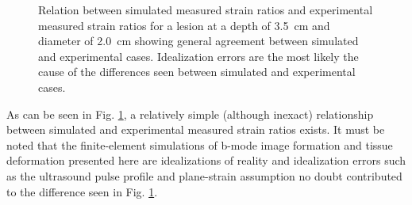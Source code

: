 			\begin{figure}[!htb]
				\centering
				\caption[Experimental validation of quasi-static model results]{Relation between simulated measured strain ratios and experimental measured strain ratios for a lesion at a depth of \SI{3.5}{\cm} and diameter of \SI{2.0}{\cm} showing general agreement between simulated and experimental cases. Idealization errors are the most likely the cause of the differences seen between simulated and experimental cases.}
				\label{fig:phantom_validation}
			\end{figure}

			As can be seen in Fig. \ref{fig:phantom_validation}, a relatively simple (although inexact) relationship between simulated and experimental measured strain ratios exists. It must be noted that the finite-element simulations of b-mode image formation and tissue deformation presented here are idealizations of reality and idealization errors such as the ultrasound pulse profile and plane-strain assumption no doubt contributed to the difference seen in Fig. \ref{fig:phantom_validation}.

